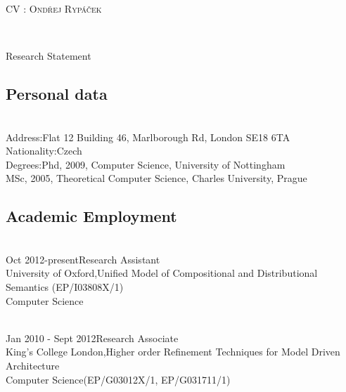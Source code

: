 \documentclass[a4paper]{article}
\begin{document}
\begin{center}\begin{Large}\textsc{CV : Ond\v{r}ej
      Ryp\'a\v{c}ek}\end{Large}\\
  \begin{large}
    Research Statement
  \end{large}

\end{center}

\subsection*{Personal data}
\vspace{-1em}
\begin{tabbing}
  \hspace{4cm}\= \\
  Address:\>Flat 12 Building 46, Marlborough Rd, London SE18 6TA\\
  Nationality:\>Czech\\
  Degrees:\>Phd, 2009, Computer Science, University of Nottingham\\
  \>MSc, 2005, Theoretical Computer Science, Charles University, Prague
\end{tabbing}
\subsection*{Academic Employment}
\vspace{-1em}
\begin{tabbing}
  \hspace{4cm}\=\\
  Oct 2012-present\>Research Assistant\\
  University of Oxford,\>Unified Model of Compositional and
  Distributional Semantics (EP/I03808X/1)\\
  Computer Science\>
\end{tabbing}
\vspace{-2em}
\begin{tabbing}
  \hspace{4cm}\=\\
  Jan 2010 - Sept 2012\>Research Associate\\
  King's College London,\>Higher order Refinement Techniques for Model
  Driven Architecture\\
  Computer Science\>(EP/G03012X/1, EP/G031711/1)
\end{tabbing}
\end{document}
